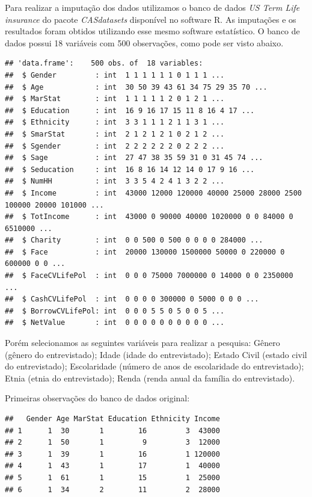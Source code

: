 \documentclass[]{article}
\begin{document}
Para realizar a imputação dos dados utilizamos o banco de dados \emph{US
Term Life insurance} do pacote \emph{CASdatasets} disponível no software
R. As imputações e os resultados foram obtidos utilizando esse mesmo
software estatístico. O banco de dados possui 18 variáveis com 500
observações, como pode ser visto abaixo.

\begin{verbatim}
## 'data.frame':    500 obs. of  18 variables:
##  $ Gender         : int  1 1 1 1 1 1 0 1 1 1 ...
##  $ Age            : int  30 50 39 43 61 34 75 29 35 70 ...
##  $ MarStat        : int  1 1 1 1 1 2 0 1 2 1 ...
##  $ Education      : int  16 9 16 17 15 11 8 16 4 17 ...
##  $ Ethnicity      : int  3 3 1 1 1 2 1 1 3 1 ...
##  $ SmarStat       : int  2 1 2 1 2 1 0 2 1 2 ...
##  $ Sgender        : int  2 2 2 2 2 2 0 2 2 2 ...
##  $ Sage           : int  27 47 38 35 59 31 0 31 45 74 ...
##  $ Seducation     : int  16 8 16 14 12 14 0 17 9 16 ...
##  $ NumHH          : int  3 3 5 4 2 4 1 3 2 2 ...
##  $ Income         : int  43000 12000 120000 40000 25000 28000 2500 100000 20000 101000 ...
##  $ TotIncome      : int  43000 0 90000 40000 1020000 0 0 84000 0 6510000 ...
##  $ Charity        : int  0 0 500 0 500 0 0 0 0 284000 ...
##  $ Face           : int  20000 130000 1500000 50000 0 220000 0 600000 0 0 ...
##  $ FaceCVLifePol  : int  0 0 0 75000 7000000 0 14000 0 0 2350000 ...
##  $ CashCVLifePol  : int  0 0 0 0 300000 0 5000 0 0 0 ...
##  $ BorrowCVLifePol: int  0 0 0 5 5 0 5 0 0 5 ...
##  $ NetValue       : int  0 0 0 0 0 0 0 0 0 0 ...
\end{verbatim}

Porém selecionamos as seguintes variáveis para realizar a pesquisa:
Gênero (gênero do entrevistado); Idade (idade do entrevistado); Estado
Civil (estado civil do entrevistado); Escolaridade (número de anos de
escolaridade do entrevistado); Etnia (etnia do entrevistado); Renda
(renda anual da família do entrevistado).

Primeiras observações do banco de dados original:

\begin{verbatim}
##   Gender Age MarStat Education Ethnicity Income
## 1      1  30       1        16         3  43000
## 2      1  50       1         9         3  12000
## 3      1  39       1        16         1 120000
## 4      1  43       1        17         1  40000
## 5      1  61       1        15         1  25000
## 6      1  34       2        11         2  28000
\end{verbatim}
\end{document}
